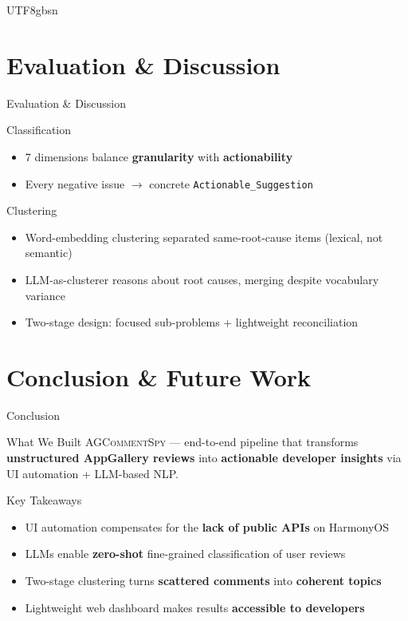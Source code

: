 \documentclass[11pt,aspectratio=169]{beamer}
\begin{document}
\begin{CJK*}{UTF8}{gbsn}
\section{Evaluation \& Discussion}

\begin{frame}{Evaluation \& Discussion}
  \begin{block}{Classification}
    \begin{itemize}
      \item 7 dimensions balance \textbf{granularity} with \textbf{actionability}
      \item Every negative issue $\rightarrow$ concrete \texttt{Actionable\_Suggestion}
    \end{itemize}
  \end{block}

  \begin{block}{Clustering}
    \begin{itemize}
      \item Word-embedding clustering separated same-root-cause items (lexical, not semantic)
      \item LLM-as-clusterer reasons about root causes, merging despite vocabulary variance
      \item Two-stage design: focused sub-problems + lightweight reconciliation
    \end{itemize}
  \end{block}
\end{frame}

\section{Conclusion \& Future Work}

\begin{frame}{Conclusion}
  \begin{block}{What We Built}
    \textsc{AGCommentSpy} --- end-to-end pipeline that transforms
    \textbf{unstructured AppGallery reviews} into \textbf{actionable developer
    insights} via UI automation + LLM-based NLP.
  \end{block}

  \begin{block}{Key Takeaways}
    \begin{itemize}
      \item UI automation compensates for the \textbf{lack of public APIs} on HarmonyOS
      \item LLMs enable \textbf{zero-shot} fine-grained classification of user reviews
      \item Two-stage clustering turns \textbf{scattered comments} into \textbf{coherent topics}
      \item Lightweight web dashboard makes results \textbf{accessible to developers}
    \end{itemize}
  \end{block}
\end{frame}


\end{CJK*}
\end{document}
